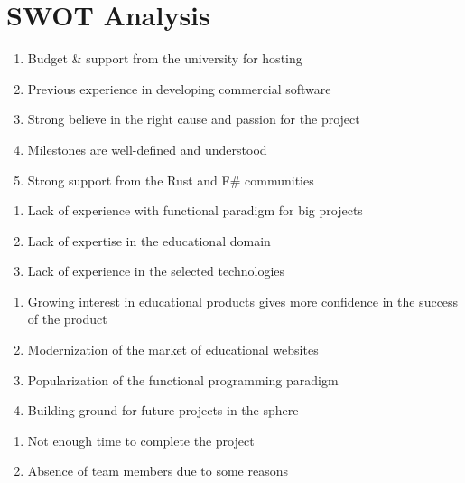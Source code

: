 \documentclass[a4paper,11pt,twoside]{report}
\theoremstyle{definition}
\begin{document}
\chapter*{SWOT Analysis}
\begin{tcbraster}[raster columns=2, boxrule=0mm, arc=0mm]
  \singlespacing
\begin{tcolorbox}[equal height group=A, size=fbox, colback=swotS!60, colframe=swotS!80!black, title=\textsc{strengths}]
\begin{enumerate} \itemsep0em 
\item Budget \& support from the university for hosting
\item Previous experience in developing commercial software
\item Strong believe in the right cause and passion for the project
\item Milestones are well-defined and understood
\item Strong support from the Rust and F\# communities
\end{enumerate}
\end{tcolorbox}
\begin{tcolorbox}[equal height group=A, size=fbox, colback=swotW!60, colframe=swotW!80!black, title=\textsc{weaknesses}]
\begin{enumerate} \itemsep0em 
\item Lack of experience with functional paradigm for big projects
\item Lack of expertise in the educational domain
\item Lack of experience in the selected technologies
\end{enumerate}
\end{tcolorbox}
\begin{tcolorbox}[equal height group=B, size=fbox, colback=swotO!60, colframe=swotO!80!black, title=\textsc{opportunities}]
\begin{enumerate} \itemsep0em 
\item Growing interest in educational products gives more confidence in the success of the product
\item Modernization of the market of educational websites  
\item Popularization of the functional programming paradigm
\item Building ground for future projects in the sphere 
\end{enumerate}
\end{tcolorbox}
\begin{tcolorbox}[equal height group=B, size=fbox, colback=swotT!60, colframe=swotT!80!black, title=\textsc{threats}]
\begin{enumerate} \itemsep0em 
\item Not enough time to complete the project
\item Absence of team members due to some reasons
\end{enumerate}
\end{tcolorbox}
\end{tcbraster}
\end{document}
